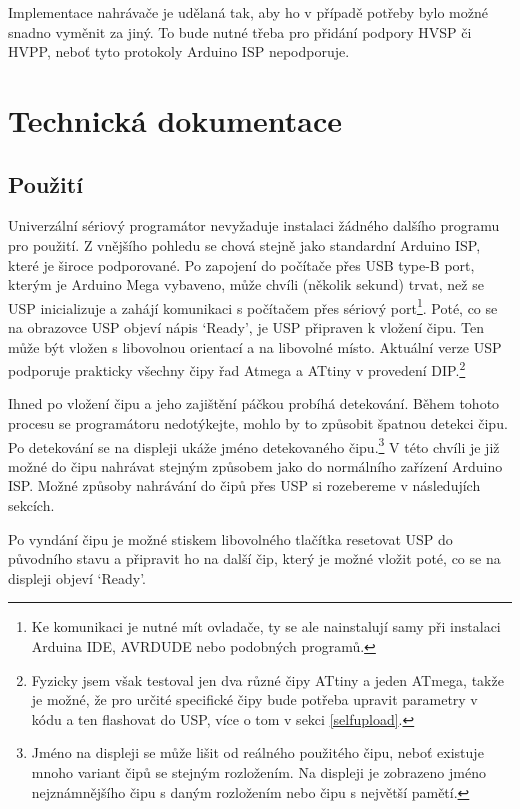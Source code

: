 \documentclass[11pt,a4paper,twoside,openright]{report}
\begin{document}
Implementace nahrávače je udělaná tak, aby ho v případě potřeby bylo možné snadno vyměnit za jiný. To bude nutné třeba pro přidání podpory HVSP či HVPP, neboť tyto protokoly Arduino ISP nepodporuje.

\chapter{Technická dokumentace}

\section {Použití}

Univerzální sériový programátor nevyžaduje instalaci žádného dalšího programu pro použití. Z vnějšího pohledu se chová stejně jako standardní Arduino ISP, které je široce podporované. Po zapojení do počítače přes USB type-B port, kterým je Arduino Mega vybaveno, může chvíli (několik sekund) trvat, než se USP inicializuje a zahájí komunikaci s počítačem přes sériový port\footnote{Ke komunikaci je nutné mít ovladače, ty se ale nainstalují samy při instalaci Arduina IDE, AVRDUDE nebo podobných programů.}. Poté, co se na obrazovce USP objeví nápis \lq Ready\rq ,  je USP připraven k vložení čipu. Ten může být vložen s libovolnou orientací a na libovolné místo. Aktuální verze USP podporuje prakticky všechny čipy řad Atmega a ATtiny v provedení DIP.\footnote{Fyzicky jsem však testoval jen dva různé čipy ATtiny a jeden ATmega, takže je možné, že pro určité specifické čipy bude potřeba upravit parametry v kódu a ten flashovat do USP, více o tom v sekci \ref{selfupload}.} 

Ihned po vložení čipu a jeho zajištění páčkou probíhá detekování. Během tohoto procesu se programátoru nedotýkejte, mohlo by to způsobit špatnou detekci čipu. Po detekování se na displeji ukáže jméno detekovaného čipu.\footnote{Jméno na displeji se může lišit od reálného použitého čipu, neboť existuje mnoho variant čipů se stejným rozložením. Na displeji je zobrazeno jméno nejznámnějšího čipu s daným rozložením nebo čipu s největší pamětí.} V této chvíli je již možné do čipu nahrávat stejným způsobem jako do normálního zařízení Arduino ISP. Možné způsoby nahrávání do čipů přes USP si rozebereme v následujích sekcích.

Po vyndání čipu je možné stiskem libovolného tlačítka resetovat USP do původního stavu a připravit ho na další čip, který je možné vložit poté, co se na displeji objeví \lq Ready\rq .
\end{document}
